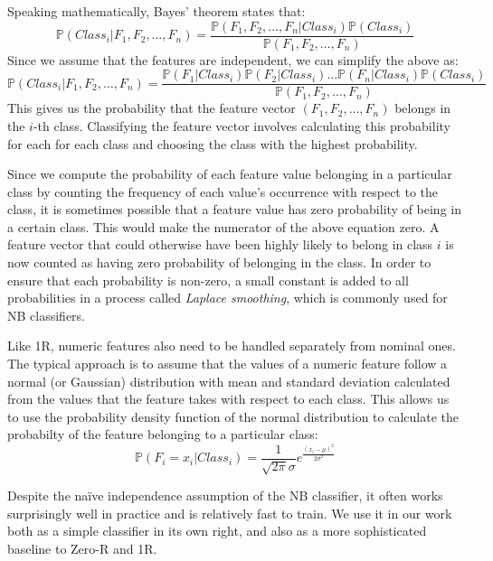 Speaking mathematically, Bayes' theorem states that:
\begin{equation*}
\mathbb{P}(Class_i|F_1,F_2,\ldots,F_n) =
  \dfrac{\mathbb{P}(F_1,F_2,\ldots,F_n|Class_i)\mathbb{P}(Class_i)}{\mathbb{P}(F_1,F_2,\ldots,F_n)}
\end{equation*}
Since we assume that the features are independent, we can simplify the above as:
\begin{equation*}
\mathbb{P}(Class_i|F_1,F_2,\ldots,F_n) =
\dfrac{\mathbb{P}(F_1|Class_i)\mathbb{P}(F_2|Class_i)\ldots \mathbb{P}(F_n|Class_i)\mathbb{P}(Class_i)}{\mathbb{P}(F_1,F_2,\ldots,F_n)}
\end{equation*}
This gives us the probability that the feature vector $(F_1,F_2,\ldots,F_n)$
belongs in the $i$-th class. Classifying the feature vector involves
calculating this probability for each for each class and choosing the class
with the highest probability.

Since we compute the probability of each feature value belonging in a
particular class by counting the frequency of each value's occurrence with
respect to the class, it is sometimes possible that a feature value has zero
probability of being in a certain class. This would make the numerator of the
above equation zero. A feature vector that could otherwise have been highly
likely to belong in class $i$ is now counted as having zero probability of
belonging in the class. In order to ensure that each probability is non-zero,
a small constant is added to all probabilities in a process called
\textit{Laplace smoothing}, which is commonly used for NB classifiers.

Like 1R, numeric features also need to be handled separately from nominal ones.
The typical approach is to assume that the values of a numeric feature follow a
normal (or Gaussian) distribution with mean and standard deviation calculated
from the values that the feature takes with respect to each class.
This allows us to use the probability
density function of the normal distribution to calculate the probabilty of the
feature belonging to a particular class:
\begin{equation*}
\mathbb{P}(F_i=x_i|Class_i) =
  \dfrac{1}{\sqrt{2\pi}\sigma}e^\frac{(x_i-\mu)^2}{2\sigma^2}
\end{equation*}

Despite the na\"{i}ve independence assumption of the NB classifier, it often
works surprisingly well in practice and is relatively fast to train. We use it
in our work both as a simple classifier in its own right, and also as a more
sophisticated baseline to Zero-R and 1R.

